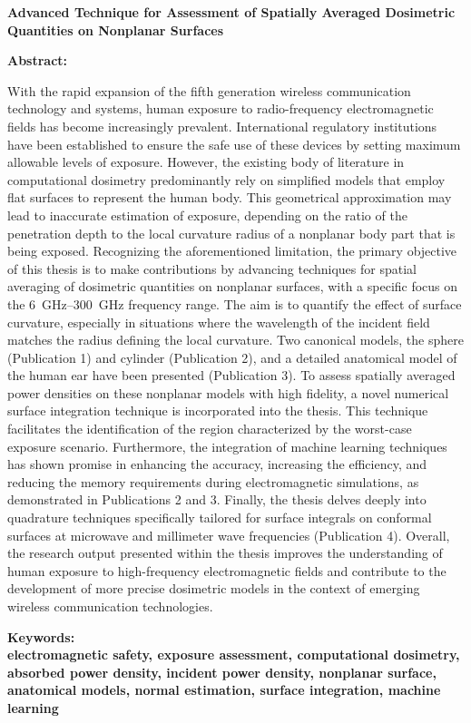 \setlength{\parindent}{0in}
{\fontsize{14}{18}\bf {Advanced Technique for Assessment of Spatially Averaged Dosimetric Quantities on Nonplanar Surfaces}}

\vskip 15mm
\textbf{Abstract:\\}	

\textnormal{With the rapid expansion of the fifth generation wireless communication technology and systems, human exposure to radio-frequency electromagnetic fields has become increasingly prevalent.
International regulatory institutions have been established to ensure the safe use of these devices by setting maximum allowable levels of exposure.
However, the existing body of literature in computational dosimetry predominantly rely on simplified models that employ flat surfaces to represent the human body.
This geometrical approximation may lead to inaccurate estimation of exposure, depending on the ratio of the penetration depth to the local curvature radius of a nonplanar body part that is being exposed.
Recognizing the aforementioned limitation, the primary objective of this thesis is to make contributions by advancing techniques for spatial averaging of dosimetric quantities on nonplanar surfaces, with a specific focus on the \SIrange{6}{300}{\GHz} frequency range.
The aim is to quantify the effect of surface curvature, especially in situations where the wavelength of the incident field matches the radius defining the local curvature.
Two canonical models, the sphere (Publication 1) and cylinder (Publication 2), and a detailed anatomical model of the human ear have been presented (Publication 3).
To assess spatially averaged power densities on these nonplanar models with high fidelity, a novel numerical surface integration technique is incorporated into the thesis.
This technique facilitates the identification of the region characterized by the worst-case exposure scenario.
Furthermore, the integration of machine learning techniques has shown promise in enhancing the accuracy, increasing the efficiency, and reducing the memory requirements during electromagnetic simulations, as demonstrated in Publications 2 and 3.
Finally, the thesis delves deeply into quadrature techniques specifically tailored for surface integrals on conformal surfaces at microwave and millimeter wave frequencies (Publication 4).
Overall, the research output presented within the thesis improves the understanding of human exposure to high-frequency electromagnetic fields and contribute to the development of more precise dosimetric models in the context of emerging wireless communication technologies.
}
	
\vskip 15mm
\bf{Keywords:\\}
\textnormal{electromagnetic safety, exposure assessment, computational dosimetry, absorbed power density, incident power density, nonplanar surface, anatomical models, normal estimation, surface integration, machine learning}
